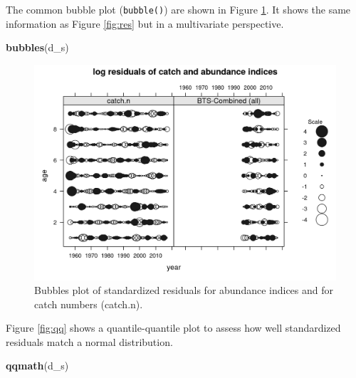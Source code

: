 \documentclass[
]{book}
\newenvironment{Shaded}{\begin{snugshade}}{\end{snugshade}}
\newcommand{\FunctionTok}[1]{\textcolor[rgb]{0.13,0.29,0.53}{\textbf{#1}}}
\newcommand{\NormalTok}[1]{#1}
\begin{document}
The common bubble plot (\texttt{bubble()}) are shown in Figure \ref{fig:bub}. It shows the same information as Figure \ref{fig:res} but in a multivariate perspective.

\begin{Shaded}
\begin{Highlighting}[]
\FunctionTok{bubbles}\NormalTok{(d\_s)}
\end{Highlighting}
\end{Shaded}

\begin{figure}
\centering
\includegraphics{_bookdown_files/_main_files/figure-html/bub-1.png}
\caption{\label{fig:bub}Bubbles plot of standardized residuals for abundance indices and for catch numbers (catch.n).}
\end{figure}

Figure \ref{fig:qq} shows a quantile-quantile plot to assess how well standardized residuals match a normal distribution.

\begin{Shaded}
\begin{Highlighting}[]
\FunctionTok{qqmath}\NormalTok{(d\_s)}
\end{Highlighting}
\end{Shaded}
\end{document}
